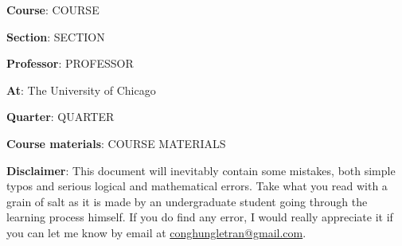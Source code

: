 \textbf{Course}: COURSE

\textbf{Section}: SECTION

\textbf{Professor}: PROFESSOR

\textbf{At}: The University of Chicago

\textbf{Quarter}: QUARTER

\textbf{Course materials}: COURSE MATERIALS

\vspace{1cm}
\textbf{Disclaimer}: This document will inevitably contain some mistakes, both simple typos and serious logical and mathematical errors. Take what you read with a grain of salt as it is made by an undergraduate student going through the learning process himself. If you do find any error, I would really appreciate it if you can let me know by email at \href{mailto:conghungletran@gmail.com}{conghungletran@gmail.com}.